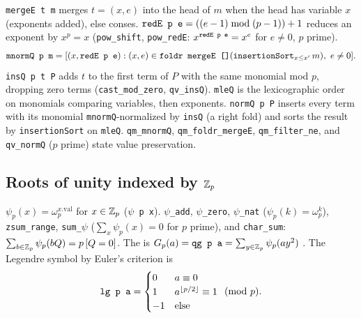 \begin{definition}\label{def:lean-pathsum-qnorm}
\textnormal{\texttt{mergeE t m}} merges $t=(x,e)$ into the head of $m$ when the head has variable $x$ (exponents
added), else conses. $\textnormal{\texttt{redE p e}} = ((e-1)\bmod(p-1))+1$ reduces an exponent by $x^p=x$
(\textnormal{\texttt{pow\_\allowbreak{}shift}}, \textnormal{\texttt{pow\_\allowbreak{}redE}}: $x^{\textnormal{\texttt{redE p e}}} = x^e$ for $e\ne0$, $p$ prime).
\[
\textnormal{\texttt{mnormQ p m}} = [(x,\textnormal{\texttt{redE p e}}) : (x,e)\in\textnormal{\texttt{foldr mergeE []}}(\textnormal{\texttt{insertionSort}}_{x\le x'}\,m),\ e\ne0].
\]
\textnormal{\texttt{insQ p t P}} adds $t$ to the first term of $P$ with the same monomial mod $p$, dropping zero
terms (\textnormal{\texttt{cast\_\allowbreak{}mod\_\allowbreak{}zero}}, \textnormal{\texttt{qv\_\allowbreak{}insQ}}). \textnormal{\texttt{mleQ}} is the lexicographic order on monomials
comparing variables, then exponents. \textnormal{\texttt{normQ p P}} inserts every term with its monomial
\textnormal{\texttt{mnormQ}}-normalized by \textnormal{\texttt{insQ}} (a right fold) and sorts the result by
\textnormal{\texttt{insertionSort}} on \textnormal{\texttt{mleQ}}. \textnormal{\texttt{qm\_\allowbreak{}mnormQ}}, \textnormal{\texttt{qm\_\allowbreak{}foldr\_\allowbreak{}mergeE}},
\textnormal{\texttt{qm\_\allowbreak{}filter\_\allowbreak{}ne}}, and \textnormal{\texttt{qv\_\allowbreak{}normQ}} ($p$ prime) state value preservation.
\end{definition}

\subsection{Roots of unity indexed by \texorpdfstring{$\mathbb{Z}_{p}$}{Z\_p}}

\begin{definition}\label{def:lean-pathsum-psi}
$\psi_p(x) = \omega_p^{x.\mathrm{val}}$ for $x\in\mathbb{Z}_{p}$ (\textnormal{\texttt{\ensuremath{\psi} p x}}). \textnormal{\texttt{\ensuremath{\psi}\_\allowbreak{}add}}, \textnormal{\texttt{\ensuremath{\psi}\_\allowbreak{}zero}},
\textnormal{\texttt{\ensuremath{\psi}\_\allowbreak{}nat}} ($\psi_p(k) = \omega_p^k$), \textnormal{\texttt{zsum\_\allowbreak{}range}}, \textnormal{\texttt{sum\_\allowbreak{}\ensuremath{\psi}}} ($\sum_x\psi_p(x)=0$ for
$p$ prime), and \textnormal{\texttt{char\_\allowbreak{}sum}}: $\sum_{b\in\mathbb{Z}_{p}}\psi_p(bQ) = p\,[Q=0]$.
The  is $G_p(a) = \textnormal{\texttt{qg p a}} = \sum_{y\in\mathbb{Z}_{p}}\psi_p(ay^2)$
\cite{berndt1998gauss}. The Legendre symbol by Euler's criterion is
\[
\textnormal{\texttt{lg p a}} = \begin{cases}0 & a\equiv0\\ 1 & a^{\lfloor p/2\rfloor}\equiv1\\ -1 & \text{else}\end{cases}\pmod p.
\]
\end{definition}

